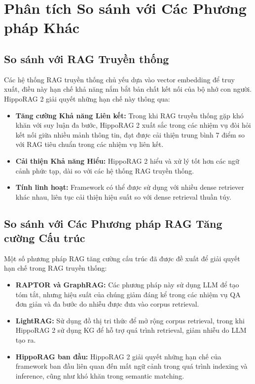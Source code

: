 \documentclass[../main.tex]{subfiles}
\begin{document}
\section{Phân tích So sánh với Các Phương pháp Khác}
\subsection{So sánh với RAG Truyền thống}
Các hệ thống RAG truyền thống chủ yếu dựa vào vector embedding để truy xuất, điều này hạn chế khả năng nắm bắt bản chất kết nối của bộ nhớ con người. HippoRAG 2 giải quyết những hạn chế này thông qua:

\begin{itemize}
\item \textbf{Tăng cường Khả năng Liên kết:} Trong khi RAG truyền thống gặp khó khăn với suy luận đa bước, HippoRAG 2 xuất sắc trong các nhiệm vụ đòi hỏi kết nối giữa nhiều mảnh thông tin, đạt được cải thiện trung bình 7 điểm so với RAG tiêu chuẩn trong các nhiệm vụ liên kết.

\item \textbf{Cải thiện Khả năng Hiểu:} HippoRAG 2 hiểu và xử lý tốt hơn các ngữ cảnh phức tạp, dài so với các hệ thống RAG truyền thống.

\item \textbf{Tính linh hoạt:} Framework có thể được sử dụng với nhiều dense retriever khác nhau, liên tục cải thiện hiệu suất so với dense retrieval thuần túy.
\end{itemize}

\subsection{So sánh với Các Phương pháp RAG Tăng cường Cấu trúc}
Một số phương pháp RAG tăng cường cấu trúc đã được đề xuất để giải quyết hạn chế trong RAG truyền thống:

\begin{itemize}
\item \textbf{RAPTOR và GraphRAG:} Các phương pháp này sử dụng LLM để tạo tóm tắt, nhưng hiệu suất của chúng giảm đáng kể trong các nhiệm vụ QA đơn giản và đa bước do nhiễu được đưa vào corpus retrieval.

\item \textbf{LightRAG:} Sử dụng đồ thị tri thức để mở rộng corpus retrieval, trong khi HippoRAG 2 sử dụng KG để hỗ trợ quá trình retrieval, giảm nhiễu do LLM tạo ra.

\item \textbf{HippoRAG ban đầu:} HippoRAG 2 giải quyết những hạn chế của framework ban đầu liên quan đến mất ngữ cảnh trong quá trình indexing và inference, cũng như khó khăn trong semantic matching.
\end{itemize}
\end{document}
